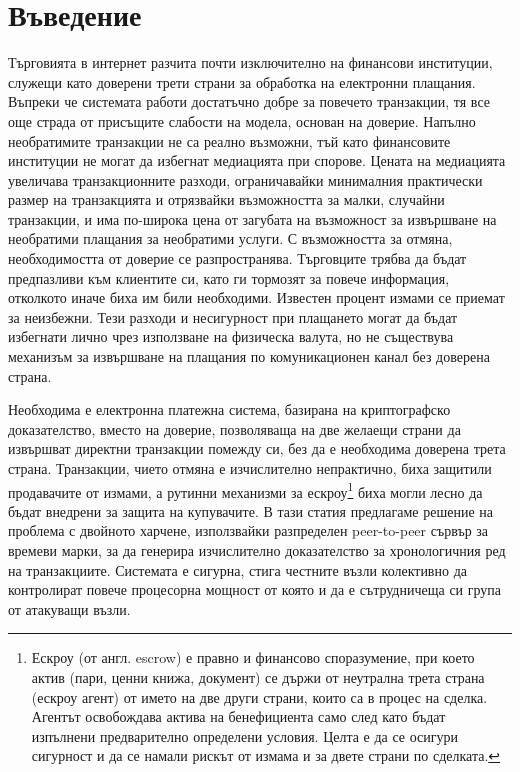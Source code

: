 \documentclass[11pt,a4paper]{article}
\begin{document}
\section{Въведение}
Търговията в интернет разчита почти изключително на финансови институции, служещи като доверени трети страни за обработка на електронни плащания. Въпреки че системата работи достатъчно добре за повечето транзакции, тя все още страда от присъщите слабости на модела, основан на доверие. Напълно необратимите транзакции не са реално възможни, тъй като финансовите институции не могат да избегнат медиацията при спорове. Цената на медиацията увеличава транзакционните разходи, ограничавайки минималния практически размер на транзакцията и отрязвайки възможността за малки, случайни транзакции, и има по-широка цена от загубата на възможност за извършване на необратими плащания за необратими услуги. С възможността за отмяна, необходимостта от доверие се разпространява. Търговците трябва да бъдат предпазливи към клиентите си, като ги тормозят за повече информация, отколкото иначе биха им били необходими. Известен процент измами се приемат за неизбежни. Тези разходи и несигурност при плащането могат да бъдат избегнати лично чрез използване на физическа валута, но не съществува механизъм за извършване на плащания по комуникационен канал без доверена страна.

Необходима е електронна платежна система, базирана на криптографско доказателство, вместо на доверие, позволяваща на две желаещи страни да извършват директни транзакции помежду си, без да е необходима доверена трета страна. Транзакции, чието отмяна е изчислително непрактично, биха защитили продавачите от измами, а рутинни механизми за ескроу\footnote{Ескроу (от англ. escrow) е правно и финансово споразумение, при което актив (пари, ценни книжа, документ) се държи от неутрална трета страна (ескроу агент) от името на две други страни, които са в процес на сделка. Агентът освобождава актива на бенефициента само след като бъдат изпълнени предварително определени условия. Целта е да се осигури сигурност и да се намали рискът от измама и за двете страни по сделката.} биха могли лесно да бъдат внедрени за защита на купувачите. В тази статия предлагаме решение на проблема с двойното харчене, използвайки разпределен peer-to-peer сървър за времеви марки, за да генерира изчислително доказателство за хронологичния ред на транзакциите. Системата е сигурна, стига честните възли колективно да контролират повече процесорна мощност от която и да е сътрудничеща си група от атакуващи възли.
\end{document}
